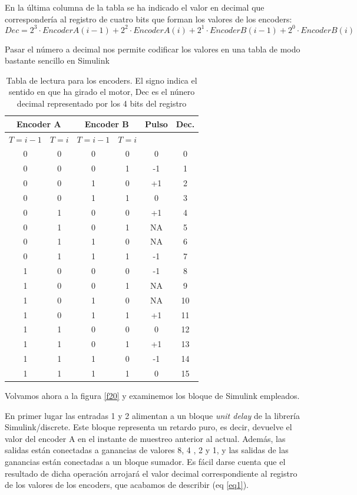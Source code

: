 \documentclass[10pt,a4paper]{report}
\begin{document}
En la última columna de la tabla se ha indicado el valor en decimal que correspondería al registro de cuatro bits que forman los valores de los encoders:
\begin{equation}\label{eq1}
Dec = 2^3\cdot EncoderA(i-1)+2^2\cdot EncoderA(i)+2^1\cdot EncoderB(i-1)+2^0\cdot EncoderB(i)
\end{equation}

Pasar el número a decimal nos permite codificar los valores en una tabla de modo bastante sencillo en Simulink
\begin{table}
\centering
\begin{tabular}{c c c c c c}
\multicolumn{2}{c}{\textbf{Encoder A}}&\multicolumn{2}{c}{\textbf{Encoder B}}&Pulso&Dec.\\
\hline
$T = i-1$&$T =i$&$T = i-1$&$T =i$& &\\
0&0&0&0&0&0\\
0&0&0&1&-1&1\\
0&0&1&0&+1&2\\
0&0&1&1&0&3\\
0&1&0&0&+1&4\\
0&1&0&1&NA&5\\
0&1&1&0&NA&6\\
0&1&1&1&-1&7\\
1&0&0&0&-1&8\\
1&0&0&1&NA&9\\
1&0&1&0&NA&10\\
1&0&1&1&+1&11\\
1&1&0&0&0&12\\
1&1&0&1&+1&13\\
1&1&1&0&-1&14\\
1&1&1&1&0&15\\
\hline
\end{tabular}
\caption{Tabla de lectura para los encoders. El signo indica el sentido en que ha girado el motor, Dec es el núnero decimal representado por los 4 bits del registro}\label{t3}
\end{table}

Volvamos ahora a la figura \ref{f20} y examinemos los bloque de Simulink empleados.

En primer lugar las entradas 1 y 2 alimentan a un bloque \emph{unit delay} de la librería Simulink/discrete. Este bloque representa un retardo puro, es decir, devuelve el valor del encoder A en el instante de muestreo anterior al actual. Además, las salidas están conectadas a ganancias de valores 8, 4 , 2 y 1, y las salidas de las ganancias están conectadas a un bloque sumador. Es fácil darse cuenta que el resultado de dicha operación arrojará el valor decimal correspondiente al registro de los valores de los encoders, que acabamos de describir (eq \ref{eq1}).
\end{document}
